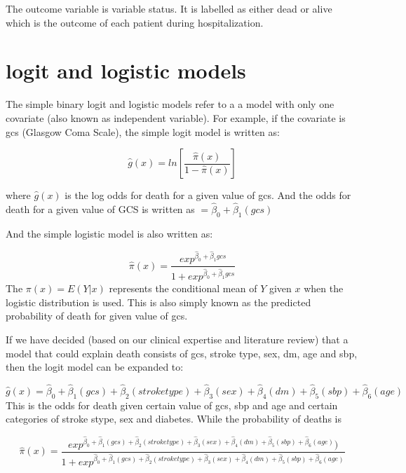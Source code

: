 \documentclass[
  10pt,
]{krantz}
\begin{document}
The outcome variable is variable status. It is labelled as either dead or alive which is the outcome of each patient during hospitalization.

\hypertarget{logit-and-logistic-models}{%
\section{\texorpdfstring{logit and logistic models}{logit and logistic models}}\label{logit-and-logistic-models}}

The simple binary logit and logistic models refer to a a model with only one covariate (also known as independent variable). For example, if the covariate is gcs (Glasgow Coma Scale), the simple logit model is written as:

\[\hat{g}(x)= ln\left[ \frac{\hat\pi(x)}{1 - {\hat\pi(x)}} \right]\]

where \(\hat{g}(x)\) is the log odds for death for a given value of gcs. And the odds for death for a given value of GCS is written as \(= \hat\beta_0 + \hat\beta_1(gcs)\)

And the simple logistic model is also written as:

\[\hat{\pi}(x) = \frac{exp^{\hat{\beta}_{0} + \hat{\beta}_{1}{gcs}}}{1 + exp^{\hat{\beta}_{0} + \hat{\beta}_{1}{gcs}}}\]
The \(\pi(x) = E(Y|x)\) represents the conditional mean of \(Y\) given \(x\) when the logistic distribution is used. This is also simply known as the predicted probability of death for given value of gcs.

If we have decided (based on our clinical expertise and literature review) that a model that could explain death consists of gcs, stroke type, sex, dm, age and sbp, then the logit model can be expanded to:

\[\hat{g}(x)  = \hat\beta_0 + \hat\beta_1(gcs) + \hat\beta_2(stroke type) + \hat\beta_3(sex)+ \hat\beta_4(dm) + \hat\beta_5(sbp) +  \hat\beta_6(age)\]
This is the odds for death given certain value of gcs, sbp and age and certain categories of stroke stype, sex and diabetes. While the probability of deaths is

\[\hat{\pi}(x) = \frac{exp^{\hat\beta_0 + \hat\beta_1(gcs) + \hat\beta_2(stroke type) + \hat\beta_3(sex)+ \hat\beta_4(dm) + \hat\beta_5(sbp) + \hat\beta_6(age)})}{1 + exp^{\hat\beta_0 + \hat\beta_1(gcs) + \hat\beta_2(stroke type) + \hat\beta_3(sex)+ \hat\beta_4(dm) + \hat\beta_5(sbp) + \hat\beta_6(age)}}\]
\end{document}
